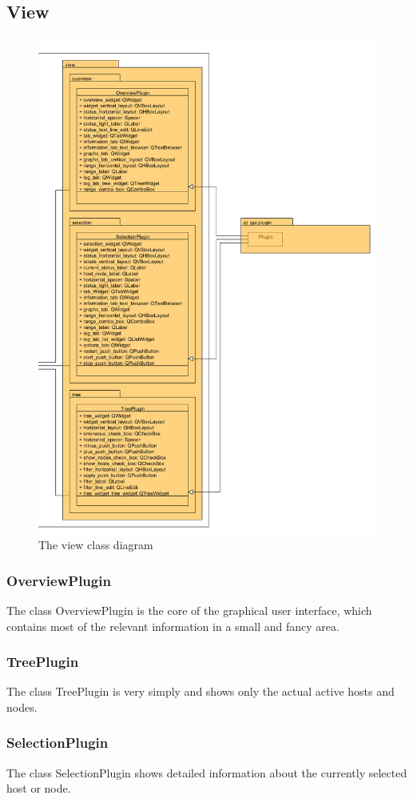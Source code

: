\subsection{View}

\begin{figure}[!ht]
\begin{center}
\includegraphics[width=\linewidth]{./bilder/view.png}
\caption{The view class diagram}
\end{center}
\end{figure}
\subsubsection{OverviewPlugin}
The class OverviewPlugin is the core of the graphical user interface, which
contains most of the relevant information in a small and fancy area.
\subsubsection{TreePlugin}
The class TreePlugin is very simply and shows only the actual active hosts
and nodes.
\subsubsection{SelectionPlugin}
The class SelectionPlugin shows detailed information about the currently
selected host or node.
